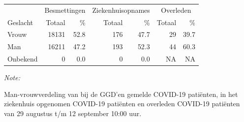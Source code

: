 \documentclass[
  english,
  man,floatsintext]{apa6}
\begin{document}
\begin{table}
\centering\begingroup\fontsize{11}{13}\selectfont

\begin{threeparttable}
\begin{tabular}{lrrrrrr}
\toprule
\multicolumn{1}{c}{ } & \multicolumn{2}{c}{Besmettingen} & \multicolumn{2}{c}{Ziekenhuisopnames} & \multicolumn{2}{c}{Overleden} \\
\cmidrule(l{3pt}r{3pt}){2-3} \cmidrule(l{3pt}r{3pt}){4-5} \cmidrule(l{3pt}r{3pt}){6-7}
Geslacht & Totaal & \% & Totaal & \% & Totaal & \%\\
\midrule
Vrouw & 18131 & 52.8 & 176 & 47.7 & 29 & 39.7\\
Man & 16211 & 47.2 & 193 & 52.3 & 44 & 60.3\\
Onbekend & 0 & 0.0 & 0 & 0.0 & NA & NA\\
\bottomrule
\end{tabular}
\begin{tablenotes}
\item \textit{Note: } 
\item Man-vrouwverdeling van bij de GGD’en gemelde COVID-19 patiënten, in het ziekenhuis opgenomen COVID-19 patiënten en overleden COVID-19 patiënten van 29 augustus t/m 12 september 10:00 uur.
\end{tablenotes}
\end{threeparttable}
\endgroup{}
\end{table}
\newpage
\end{document}
